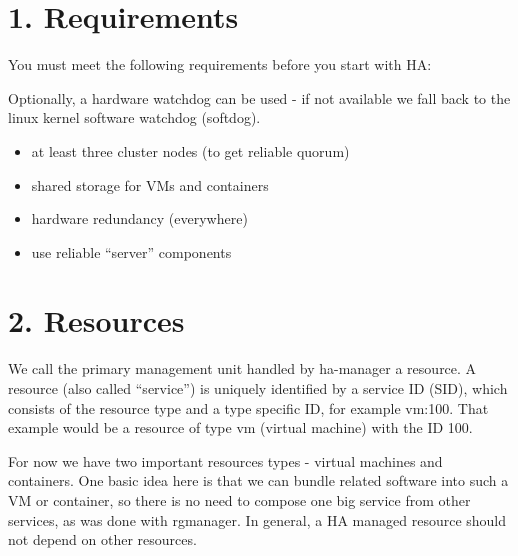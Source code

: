\begin{table}[htbp]

\centering

\begin{tabular}

\end{tabular}

\end{table}


\section{1. Requirements}

You must meet the following requirements before you start with HA:

Optionally, a hardware watchdog can be used - if not available we fall back to the linux kernel software watchdog (softdog).

\begin{itemize}[leftmargin=2cm]

	\item at least three cluster nodes (to get reliable quorum)

	\item shared storage for VMs and containers

	\item hardware redundancy (everywhere)

	\item use reliable “server” components

\end{itemize}


\section{2. Resources}

We call the primary management unit handled by ha-manager a resource. A resource (also called “service”) is uniquely identified by a service ID (SID), which consists of the resource type and a type specific ID, for example vm:100. That example would be a resource of type vm (virtual machine) with the ID 100.

For now we have two important resources types - virtual machines and containers. One basic idea here is that we can bundle related software into such a VM or container, so there is no need to compose one big service from other services, as was done with rgmanager. In general, a HA managed resource should not depend on other resources.


